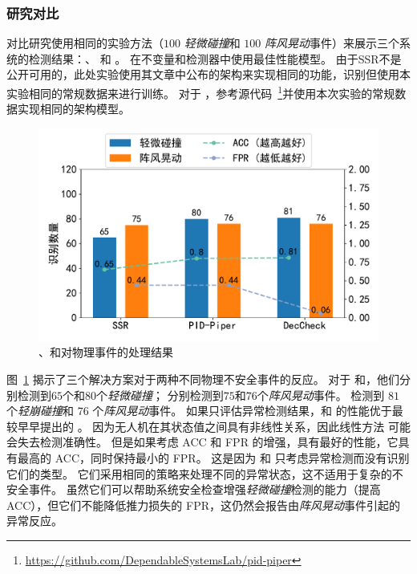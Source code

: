 \subsubsection{研究对比}  
对比研究使用相同的实验方法（$100$ \emph{轻微碰撞}和 $100$ \emph{阵风晃动}事件）来展示三个系统的检测结果：\deccheck 、 和 。
\deccheck 在不变量和检测器中使用最佳性能模型。
由于SSR不是公开可用的，此处实验使用其文章中公布的架构来实现相同的功能，识别但使用本实验相同的常规数据来进行训练。
对于 ，参考源代码~\footnote{\url{https://github.com/DependableSystemsLab/pid-piper}}并使用本次实验的常规数据实现相同的架构模型。

\begin{figure}[ht]
  \centering
    \includegraphics[width=\columnwidth]{fig/check/cmp/cmp.pdf}
\caption{、和\deccheck 对物理事件的处理结果}
\label{fig:check_cmp} 
\end{figure}  

图~\ref{fig:check_cmp} 揭示了三个解决方案对于两种不同物理不安全事件的反应。
对于 和，他们分别检测到$65$个和$80$个\emph{轻微碰撞}；
分别检测到$75$和$76$个\emph{阵风晃动}事件。
\deccheck 检测到 $81$ 个\emph{轻崩碰撞}和 $76$ 个\emph{阵风晃动}事件。
如果只评估异常检测结果，\deccheck 和  的性能优于最较早早提出的 。
因为无人机在其状态值之间具有非线性关系，因此线性方法  可能会失去检测准确性。
但是如果考虑 ACC 和 FPR 的增强，\deccheck 具有最好的性能，它具有最高的 ACC，同时保持最小的 FPR。
这是因为  和  只考虑异常检测而没有识别它们的类型。
它们采用相同的策略来处理不同的异常状态，这不适用于复杂的不安全事件。
虽然它们可以帮助系统安全检查增强\emph{轻微碰撞}检测的能力（提高 ACC），但它们不能降低推力损失的 FPR，这仍然会报告由\emph{阵风晃动}事件引起的异常反应。


